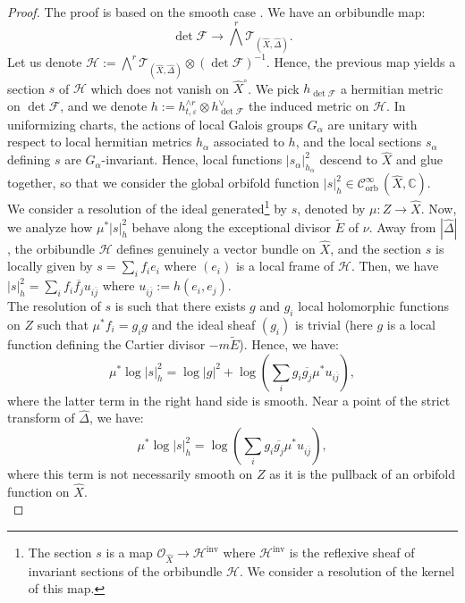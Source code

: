 \documentclass[12pt,a4paper]{amsart}
\newcommand{\C}{\mathbb{C}}
\newcommand{\orb}{\mathrm{orb}\,}
\newcommand{\inv}{\mathrm{inv}}
\theoremstyle{plain}
\theoremstyle{definition}
\begin{document}
\begin{proof}
    The proof is based on the smooth case \cite[Proof of $(\ast\ast)$, p.~166]{Kob87}. We have an orbibundle map:
    $$ 
    \det \mathcal{F} \longrightarrow \bigwedge^r \mathcal{T}_{(\widehat{X}, \widehat{\Delta})}.
    $$
    Let us denote $\mathcal{H} := \bigwedge^r \mathcal{T}_{(\widehat{X}, \widehat{\Delta})} \otimes (\det \mathcal{F})^{-1}$. Hence, the previous map yields a section $s$ of $\mathcal{H}$ which does not vanish on $\widehat{X}^\circ$. We pick $ h_{\det \mathcal{F}}$ a hermitian metric on $\det \mathcal{F}$, and we denote $h := h_{t, \varepsilon}^{\wedge r} \otimes h_{\det \mathcal{F}}^\vee$ the induced metric on $\mathcal{H}$. In uniformizing charts, the actions of local Galois groups $G_\alpha$ are unitary with respect to local hermitian metrics $h_\alpha$ associated to $h$, and the local sections $s_\alpha$ defining $s$ are $G_\alpha$-invariant. Hence, local functions $|s_\alpha|^2_{h_\alpha}$ descend to $\widehat{X}$ and glue together, so that we consider the global orbifold function $|s|^2_h \in \mathcal{C}^\infty_\orb(\widehat{X}, \C)$.\\
    
    We consider a resolution of the ideal generated\footnote{The section $s$ is a map $\mathcal{O}_{\widehat{X}} \longrightarrow \mathcal{H}^\inv$ where $\mathcal{H}^\inv$ is the reflexive sheaf of invariant sections of the orbibundle $\mathcal{H}$. We consider a resolution of the kernel of this map.} by $s$, denoted by $\mu : Z \longrightarrow \widehat{X}$. Now, we analyze how $\mu^*|s|^2_h$ behave along the exceptional divisor $\widetilde{E}$ of $\nu$. Away from $|\widehat{\Delta}|$, the orbibundle $\mathcal{H}$ defines genuinely a vector bundle on $\widehat{X}$, and the section $s$ is locally given by $s = \sum_i f_i e_i$ where $(e_i)$ is a local frame of $\mathcal{H}$. Then, we have $|s|^2_h = \sum_i f_i \overline{f_j} u_{i\overline{j}}$ where $u_{i\overline{j}} := h(e_i, e_j)$.\\
    
	The resolution of $s$ is such that there exists $g$ and $g_i$ local holomorphic functions on $Z$ such that $\mu^* f_i = g_i g$ and the ideal sheaf $(g_i)$ is trivial (here $g$ is a local function defining the Cartier divisor $-m\widetilde{E}$). Hence, we have:
	$$
	\mu^* \log |s|^2_h = \log |g|^2 + \log (\sum_i g_i \overline{g_j} \mu^* u_{i\overline{j}}),
	$$
	where the latter term in the right hand side is smooth. Near a point of the strict transform of $\widehat{\Delta}$, we have:
	$$ \mu^*\log |s|^2_h = \log (\sum_i g_i \overline{g_j} \mu^* u_{i\overline{j}}),
	$$
	where this term is not necessarily smooth on $Z$ as it is the pullback of an orbifold function on $\widehat{X}$.\\
	 

\end{proof}
\end{document}
